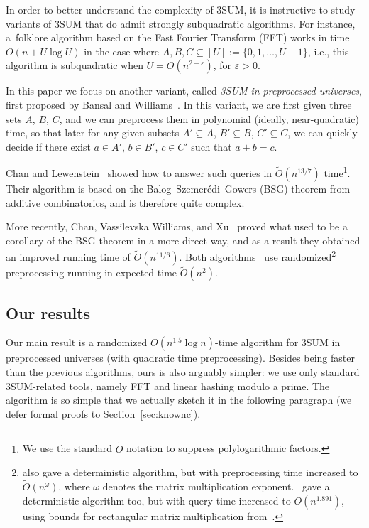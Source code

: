 \documentclass{theoretics}
\newcommand{\Ot}{\widetilde{O}}
\begin{document}
In order to better understand the complexity of 3SUM, it is instructive to study variants of 3SUM that do admit strongly subquadratic algorithms. For instance, a~folklore algorithm based on the Fast Fourier Transform (FFT) works in time $O(n + U \log U)$ in the case where $A, B, C \subseteq [U] := \{0, 1, \ldots, U-1\}$, i.e., this algorithm is subquadratic when $U = O(n^{2-\varepsilon})$, for $\varepsilon > 0$.

In this paper we focus on another variant, called \emph{3SUM in preprocessed universes}, first proposed by Bansal and Williams~\cite{BansalW12}. In this variant, we are first given three sets $A$, $B$, $C$, and we can preprocess them in polynomial (ideally, near-quadratic) time, so that later for any given subsets $A' \subseteq A$, $B' \subseteq B$, $C' \subseteq C$, we can quickly decide if there exist $a \in A'$, $b \in B'$, $c \in C'$ such that $a+b=c$.

Chan and Lewenstein~\cite{ChanL15} showed how to answer such queries in $\Ot(n^{13/7})$ time\footnote{We use the standard $\Ot$ notation to suppress polylogarithmic factors.}. Their algorithm is based on the Balog--Szemer\'edi--Gowers (BSG) theorem from additive combinatorics, and is therefore quite complex.

More recently, Chan, Vassilevska Williams, and Xu~\cite{ChanWX23} proved what used to be a corollary of the BSG theorem in a more direct way, and as a result they obtained an improved running time of $\Ot(n^{11/6})$. Both algorithms~\cite{ChanL15,ChanWX23} use randomized\footnote{\cite{ChanL15} also gave a deterministic algorithm, but with preprocessing time increased to $\Ot(n^\omega)$, where $\omega$ denotes the matrix multiplication exponent.~\cite{ChanWX23} gave a deterministic algorithm too, but with query time increased to $O(n^{1.891})$, using bounds for rectangular matrix multiplication from~\cite{LeGallU18}.} preprocessing running in expected time $\Ot(n^2)$.

\subsection{Our results}
\label{sec:ourresults}

Our main result is a randomized $O(n^{1.5} \log n)$-time algorithm for 3SUM in preprocessed universes (with quadratic time preprocessing). Besides being faster than the previous algorithms, ours is also arguably simpler: we use only standard 3SUM-related tools, namely FFT and linear hashing modulo a prime. The algorithm is so simple that we actually sketch it in the following paragraph (we defer formal proofs to Section~\ref{sec:knownc}).
\end{document}
